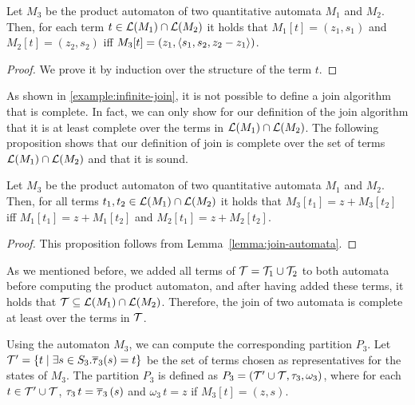 \begin{lemma}\label{lemma:join-automata}
    Let $M_3$ be the product automaton of two quantitative automata $M_1$ and $M_2$.
    Then, for each term $t \in \mathcal{L}(M_1) \cap \mathcal{L}(M_2)$ it holds that $M_1[t] = (z_1, s_1)$ and $M_2[t] = (z_2, s_2)$ iff $M_3[t] = (z_1, \langle s_1, s_2, z_2 - z_1\rangle)$.
\end{lemma}
\begin{proof}
    We prove it by induction over the structure of the term $t$.
\end{proof}

As shown in \cref{example:infinite-join}, it is not possible to define a join algorithm that is complete.
In fact, we can only show for our definition of the join algorithm that it is at least complete over the terms in $\mathcal{L}(M_1) \cap \mathcal{L}(M_2)$.
The following proposition shows that our definition of join is complete over the set of terms $\mathcal{L}(M_1) \cap \mathcal{L}(M_2)$ and that it is sound.

\begin{proposition}\label{prop:join-automata}
    Let $M_3$ be the product automaton of two quantitative automata $M_1$ and $M_2$.
    Then, for all terms $t_1, t_2 \in \mathcal{L}(M_1) \cap \mathcal{L}(M_2)$ it holds that $M_3[t_1] = z + M_3[t_2]$ iff $M_1[t_1] = z + M_1[t_2]$ and $M_2[t_1] = z + M_2[t_2]$.
\end{proposition}
\begin{proof}
    This proposition follows from Lemma~\ref{lemma:join-automata}.
\end{proof}

As we mentioned before, we added all terms of $\mathcal{T} = \mathcal{T}_1 \cup \mathcal{T}_2$ to both automata before computing the product automaton, and after having added these terms, it holds that $\mathcal{T} \subseteq \mathcal{L}(M_1) \cap \mathcal{L}(M_2)$.
Therefore, the join of two automata is complete at least over the terms in $\mathcal{T}$.

Using the automaton $M_3$, we can compute the corresponding partition $P_3$.
Let $\mathcal{T}' = \{t \mid \exists s \in S_3 . \overline{\tau}_3(s) = t\}$ be the set of terms chosen as representatives for the states of $M_3$.
The partition $P_3$ is defined as $P_3 = (\mathcal{T}' \cup \mathcal{T}, \tau_3, \omega_3)$,
where for each $t \in \mathcal{T}' \cup \mathcal{T}$, $\tau_3\,t = \overline{\tau}_3\,(s)$ and $\omega_3\,t = z$ if $M_3[t] = (z,s)$.

